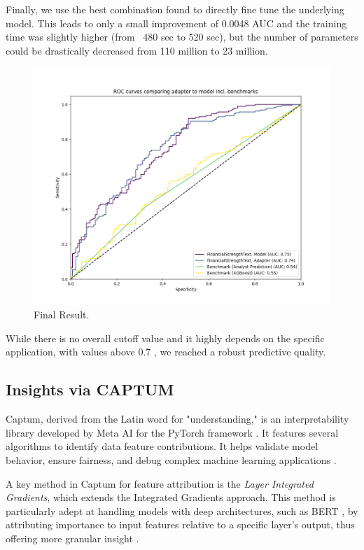 \documentclass[conference]{IEEEtran}
\begin{document}
Finally, we use the best combination found to directly fine tune the underlying model. This leads to only a small improvement of 0.0048 AUC and the training time was slightly higher (from ~480 sec to 520 sec), but the number of parameters could be drastically decreased from 110 million to 23 million.

\begin{figure}[H]
    \centering
    \includegraphics[width=.85\linewidth]{../3. evaluation/roc_curves/Fourth Experiment.png}
    \caption[Fourth Experiment]{Final Result.}
    \label{fig:Fourthexp}
\end{figure}

While there is no overall cutoff value and it highly depends on the specific application, with values above 0.7 \cite{Hosmer2013}, we reached a robust predictive quality.

\subsection{Insights via CAPTUM}%
Captum, derived from the Latin word for "understanding," is an interpretability library developed by Meta AI for the PyTorch framework \cite{paszke2019pytorch}. It features several algorithms to identify data feature contributions. It helps validate model behavior, ensure fairness, and debug complex machine learning applications \cite{Kokhlikyan2020}.

A key method in Captum for feature attribution is the \textit{Layer Integrated Gradients}, which extends the Integrated Gradients \cite{sundararajan2017axiomatic} approach. This method is particularly adept at handling models with deep architectures, such as BERT \cite{devlin2019bert}, by attributing importance to input features relative to a specific layer's output, thus offering more granular insight \cite{sundararajan2017axiomatic}.
\end{document}
